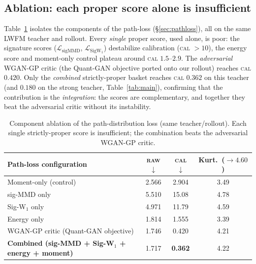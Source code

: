 \documentclass[11pt]{article}
\newcommand{\raw}{\textsc{raw}}
\renewcommand{\cal}{\textsc{cal}}
\newcommand{\best}[1]{\textbf{#1}}
\begin{document}
\subsection{Ablation: each proper score alone is insufficient}
\label{sec:ablation-path}
Table~\ref{tab:ablation} isolates the components of the path-loss
(\S\ref{sec:pathloss}), all on the same LWFM teacher and rollout. Every
\emph{single} proper score, used alone, is poor: the signature scores
($\mathcal L_{\mathrm{sigMMD}}$, $\mathcal L_{\mathrm{SigW_1}}$) destabilize
calibration (\cal{} $>10$), the energy score and moment-only control plateau
around \cal{} $1.5$--$2.9$. The \emph{adversarial} WGAN-GP critic (the Quant-GAN
objective ported onto our rollout) reaches \cal{} $0.420$. Only the
\emph{combined} strictly-proper basket reaches \cal{} $0.362$ on this teacher
(and $0.180$ on the strong teacher, Table~\ref{tab:main}), confirming that the
contribution is the \emph{integration}: the scores are complementary, and together
they beat the adversarial critic without its instability.

\begin{table}[t]
\centering
\caption{Component ablation of the path-distribution loss (same teacher/rollout).
Each single strictly-proper score is insufficient; the combination beats the
adversarial WGAN-GP critic.}
\label{tab:ablation}
\small
\begin{tabular}{l c c c}
\toprule
Path-loss configuration & \raw{} $\downarrow$ & \cal{} $\downarrow$ & Kurt.\ ($\to 4.60$) \\
\midrule
Moment-only (control)                       & 2.566 & 2.904 & 3.49 \\
sig-MMD only                                & 5.510 & 15.08 & 4.78 \\
Sig-W$_1$ only                              & 4.971 & 11.79 & 4.59 \\
Energy only                                 & 1.814 & 1.555 & 3.39 \\
WGAN-GP critic (Quant-GAN objective)        & 1.746 & 0.420 & 4.21 \\
\textbf{Combined (sig-MMD + Sig-W$_1$ + energy + moment)} & 1.717 & \best{0.362} & 4.22 \\
\bottomrule
\end{tabular}
\end{table}
\end{document}
